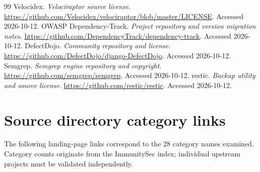 \documentclass[11pt,oneside]{report}
\begin{document}
\begin{thebibliography}{99}
 Velocidex. \emph{Velociraptor source license}. \url{https://github.com/Velocidex/velociraptor/blob/master/LICENSE}. Accessed 2026-10-12.
 OWASP Dependency-Track. \emph{Project repository and version migration notes}. \url{https://github.com/DependencyTrack/dependency-track}. Accessed 2026-10-12.
 DefectDojo. \emph{Community repository and license}. \url{https://github.com/DefectDojo/django-DefectDojo}. Accessed 2026-10-12.
 Semgrep. \emph{Semgrep engine repository and copyright}. \url{https://github.com/semgrep/semgrep}. Accessed 2026-10-12.
 restic. \emph{Backup utility and source license}. \url{https://github.com/restic/restic}. Accessed 2026-10-12.
\end{thebibliography}
\appendix
\chapter{Source directory category links}
The following landing-page links correspond to the 28 category names examined. Category counts originate from the ImmunitySec index; individual upstream projects must be validated independently.
\end{document}
